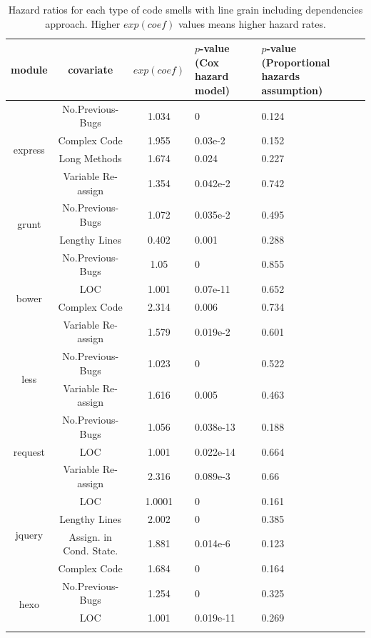 \begin{table}[t]
	\centering
	\scriptsize
	\caption{Hazard ratios for each type of code smells with line grain including dependencies approach. Higher $exp(coef)$ values means higher hazard rates.}
	\begin{tabular}{c|c|c|p{1.1cm}|p{1.3cm}}
		\hline
		module & covariate & $exp(coef)$ & $p$-value (Cox hazard model) & $p$-value (Proportional hazards assumption) \\ \hline
		\multirow{4}{*}{express}
		& No.Previous-Bugs & 1.034 & 0 & 0.124 \\ \cline{2-5}
		& Complex Code & 1.955 & 0.03e-2 & 0.152 \\ \cline{2-5}
		& Long Methods & 1.674 & 0.024 & 0.227 \\ \cline{2-5}
		& Variable Re-assign & 1.354 & 0.042e-2 & 0.742 \\ \hline
		\multirow{2}{*}{grunt} 
		& No.Previous-Bugs & 1.072 & 0.035e-2 & 0.495 \\ \cline{2-5}
		& Lengthy Lines & 0.402 & 0.001 & 0.288 \\ \hline
		\multirow{4}{*}{bower}
		& No.Previous-Bugs & 1.05 & 0 & 0.855 \\ \cline{2-5}
		& LOC & 1.001 & 0.07e-11 & 0.652 \\ \cline{2-5}
		& Complex Code & 2.314 & 0.006 & 0.734 \\ \cline{2-5}
		& Variable Re-assign & 1.579 & 0.019e-2 & 0.601 \\ \hline
		\multirow{2}{*}{less}
		& No.Previous-Bugs & 1.023 & 0 & 0.522 \\ \cline{2-5}
		& Variable Re-assign & 1.616 & 0.005 & 0.463 \\ \hline
		\multirow{3}{*}{request}
		& No.Previous-Bugs & 1.056 & 0.038e-13 & 0.188 \\ \cline{2-5}
		& LOC & 1.001 & 0.022e-14 & 0.664 \\ \cline{2-5}
		& Variable Re-assign & 2.316 & 0.089e-3 & 0.66 \\ \hline
		\multirow{4}{*}{jquery}
		& LOC & 1.0001 & 0 & 0.161 \\ \cline{2-5}
		& Lengthy Lines & 2.002 & 0 & 0.385 \\ \cline{2-5}
		& Assign. in Cond. State. & 1.881 & 0.014e-6 & 0.123 \\ \cline{2-5}
		& Complex Code & 1.684 & 0 & 0.164 \\ \hline
		\multirow{3}{*}{hexo}
		& No.Previous-Bugs & 1.254 & 0 & 0.325 \\ \cline{2-5}
		& LOC & 1.001 & 0.019e-11 & 0.269 \\ \cline{2-5}

\end{tabular}
\end{table}
